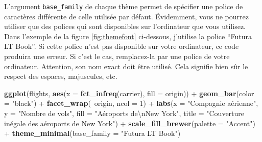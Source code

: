 \documentclass[
  a4paper,
]{article}
\newenvironment{Shaded}{\begin{snugshade}}{\end{snugshade}}
\newcommand{\CharTok}[1]{\textcolor[rgb]{0.57,0.30,0.62}{#1}}
\newcommand{\DataTypeTok}[1]{\textcolor[rgb]{0.00,0.34,0.68}{#1}}
\newcommand{\DecValTok}[1]{\textcolor[rgb]{0.69,0.50,0.00}{#1}}
\newcommand{\KeywordTok}[1]{\textcolor[rgb]{0.12,0.11,0.11}{\textbf{#1}}}
\newcommand{\NormalTok}[1]{\textcolor[rgb]{0.12,0.11,0.11}{#1}}
\newcommand{\OperatorTok}[1]{\textcolor[rgb]{0.12,0.11,0.11}{#1}}
\newcommand{\StringTok}[1]{\textcolor[rgb]{0.75,0.01,0.01}{#1}}
\begin{document}
L'argument \texttt{base\_family} de chaque thème permet de spécifier une police de caractères différente de celle utilisée par défaut. Évidemment, vous ne pourrez utiliser que des polices qui sont disponibles sur l'ordinateur que vous utilisez. Dans l'exemple de la figure \ref{fig:themefont} ci-dessous, j'utilise la police ``Futura LT Book''. Si cette police n'est pas disponible sur votre ordinateur, ce code produira une erreur. Si c'est le cas, remplacez-la par une police de votre ordinateur. Attention, son nom exact doit être utilisé. Cela signifie bien sûr le respect des espaces, majuscules, etc.

\begin{Shaded}
\begin{Highlighting}[]
\KeywordTok{ggplot}\NormalTok{(flights, }\KeywordTok{aes}\NormalTok{(}\DataTypeTok{x =} \KeywordTok{fct_infreq}\NormalTok{(carrier), }\DataTypeTok{fill =}\NormalTok{ origin)) }\OperatorTok{+}
\StringTok{  }\KeywordTok{geom_bar}\NormalTok{(}\DataTypeTok{color =} \StringTok{"black"}\NormalTok{) }\OperatorTok{+}
\StringTok{  }\KeywordTok{facet_wrap}\NormalTok{(}\OperatorTok{~}\NormalTok{origin, }\DataTypeTok{ncol =} \DecValTok{1}\NormalTok{) }\OperatorTok{+}
\StringTok{  }\KeywordTok{labs}\NormalTok{(}\DataTypeTok{x =} \StringTok{"Compagnie aérienne"}\NormalTok{,}
       \DataTypeTok{y =} \StringTok{"Nombre de vols"}\NormalTok{,}
       \DataTypeTok{fill =} \StringTok{"Aéroports de}\CharTok{\textbackslash{}n}\StringTok{New York"}\NormalTok{,}
       \DataTypeTok{title =} \StringTok{"Couverture inégale des aéroports de New York"}\NormalTok{) }\OperatorTok{+}
\StringTok{  }\KeywordTok{scale_fill_brewer}\NormalTok{(}\DataTypeTok{palette =} \StringTok{"Accent"}\NormalTok{) }\OperatorTok{+}
\StringTok{  }\KeywordTok{theme_minimal}\NormalTok{(}\DataTypeTok{base_family =} \StringTok{"Futura LT Book"}\NormalTok{)}
\end{Highlighting}
\end{Shaded}
\end{document}
